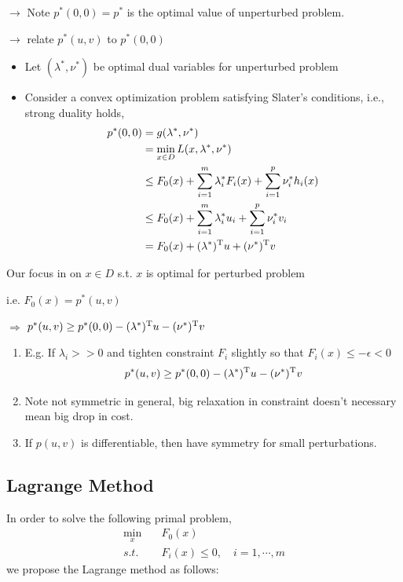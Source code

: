 $\rightarrow$ Note $p^*(0,0) = p^*$ is the optimal value of unperturbed problem.

$\rightarrow$ relate $p^*(u,v)$ to $p^*(0,0)$\\

\begin{itemize}
	\item Let $(\lambda^*, \nu^*)$ be optimal dual variables for unperturbed problem
	
	\item Consider a convex optimization problem satisfying Slater's conditions, i.e., strong duality holds,
	\begin{align*}
		p^*(0,0) &= g(\lambda^*, \nu^*)\\
		&= \min_{x\in D} L(x, \lambda^*, \nu^*)\\
		&\leq F_0(x) + \sum^m_{i=1}\lambda_i^* F_i(x) + \sum^p_{i=1}\nu_i^* h_i(x)\\
		&\leq F_0(x) + \sum^m_{i=1}\lambda_i^* u_i + \sum^p_{i=1}\nu^*_iv_i\\
		&= F_0(x) + (\lambda^*)^{{\rm T}}u+(\nu^*)^{{\rm T}}v
	\end{align*}
\end{itemize}
Our focus in on $x\in D$ s.t. $x$ is optimal for perturbed problem

i.e. $F_0(x)=p^*(u,v)$

$\Rightarrow$ $p^*(u,v) \geq p^*(0,0) - (\lambda^*)^{{\rm T}}u - (\nu^*)^{{\rm T}}v$

\begin{enumerate}
	\item E.g. If $\lambda_i >> 0$ and tighten constraint $F_i$ slightly so that $F_i(x)\leq -\epsilon < 0$
	$$p^*(u,v)\geq p^*(0,0) - (\lambda^*)^{{\rm T}}u - (\nu^*)^{{\rm T}}v$$
	
	\item Note not symmetric in general, big relaxation in constraint doesn't necessary mean big drop in cost.
	
	\item If $p(u,v)$ is differentiable, then have symmetry for small perturbations. 
\end{enumerate}

\subsection{Lagrange Method}
In order to solve the following primal problem,
\begin{align*}
	\min_x &\quad F_0(x)\\
	s.t. &\quad F_i(x) \leq 0,\quad i = 1,\cdots,m
\end{align*}
we propose the Lagrange method as follows:

